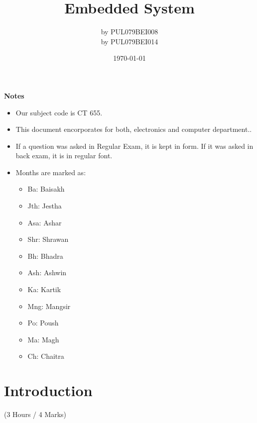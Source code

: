 \documentclass[12pt]{article}
\title{Embedded System}
\author{by PUL079BEI008\\by PUL079BEI014}
\date{\today}
\begin{document}
\maketitle
\vspace{10.5cm}
\textbf{Notes}
\begin{itemize}[noitemsep]
	\item Our subject code is CT 655.
	\item This document encorporates for both, electronics and computer department..
	\item If a question was asked in Regular Exam, it is kept in  form. If it was asked in back exam, it is in regular font.
	\item Months are marked as: 
	\begin{itemize}[noitemsep, topsep=0pt]
		\item Ba: Baisakh
		\item Jth: Jestha
		\item Asa: Ashar
		\item Shr: Shrawan
		\item Bh: Bhadra
		\item Ash: Ashwin
		\item Ka: Kartik
		\item Mng: Mangsir
		\item Po: Poush
		\item Ma: Magh
		\item Ch: Chaitra
	\end{itemize}
\end{itemize}
\pagebreak
\tableofcontents
\pagebreak

\section{Introduction}
  \begin{center}(3 Hours / 4 Marks)\end{center}
\end{document}
